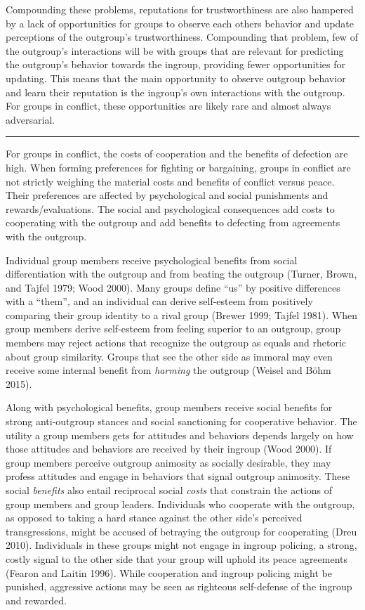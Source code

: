 \documentclass[11pt]{article}
\begin{document}
Compounding these problems, reputations for trustworthiness are also
hampered by a lack of opportunities for groups to observe each others
behavior and update perceptions of the outgroup's trustworthiness.
Compounding that problem, few of the outgroup's interactions will be
with groups that are relevant for predicting the outgroup's behavior
towards the ingroup, providing fewer opportunities for updating. This
means that the main opportunity to observe outgroup behavior and learn
their reputation is the ingroup's own interactions with the outgroup.
For groups in conflict, these opportunities are likely rare and almost
always adversarial.

\begin{center}\rule{0.5\linewidth}{\linethickness}\end{center}

For groups in conflict, the costs of cooperation and the benefits of
defection are high. When forming preferences for fighting or bargaining,
groups in conflict are not strictly weighing the material costs and
benefits of conflict versus peace. Their preferences are affected by
psychological and social punishments and rewards/evaluations. The social
and psychological consequences add costs to cooperating with the
outgroup and add benefits to defecting from agreements with the
outgroup.

Individual group members receive psychological benefits from social
differentiation with the outgroup and from beating the outgroup (Turner,
Brown, and Tajfel 1979; Wood 2000). Many groups define ``us'' by
positive differences with a ``them'', and an individual can derive
self-esteem from positively comparing their group identity to a rival
group (Brewer 1999; Tajfel 1981). When group members derive self-esteem
from feeling superior to an outgroup, group members may reject actions
that recognize the outgroup as equals and rhetoric about group
similarity. Groups that see the other side as immoral may even receive
some internal benefit from \emph{harming} the outgroup (Weisel and Böhm
2015).

Along with psychological benefits, group members receive social benefits
for strong anti-outgroup stances and social sanctioning for cooperative
behavior. The utility a group members gets for attitudes and behaviors
depends largely on how those attitudes and behaviors are received by
their ingroup (Wood 2000). If group members perceive outgroup animosity
as socially desirable, they may profess attitudes and engage in
behaviors that signal outgroup animosity. These social \emph{benefits}
also entail reciprocal social \emph{costs} that constrain the actions of
group members and group leaders. Individuals who cooperate with the
outgroup, as opposed to taking a hard stance against the other side's
perceived transgressions, might be accused of betraying the outgroup for
cooperating (Dreu 2010). Individuals in these groups might not engage in
ingroup policing, a strong, costly signal to the other side that your
group will uphold its peace agreements (Fearon and Laitin 1996). While
cooperation and ingroup policing might be punished, aggressive actions
may be seen as righteous self-defense of the ingroup and rewarded.
\end{document}
